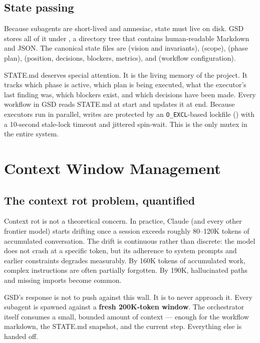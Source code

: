 \documentclass[11pt,letterpaper,openany]{book}
\begin{document}
\section{State passing}

Because subagents are short-lived and amnesiac, state must live on disk. GSD stores all of it under , a directory tree that contains human-readable Markdown and JSON. The canonical state files are  (vision and invariants),  (scope),  (phase plan),  (position, decisions, blockers, metrics), and  (workflow configuration).

STATE.md deserves special attention. It is the living memory of the project. It tracks which phase is active, which plan is being executed, what the executor's last finding was, which blockers exist, and which decisions have been made. Every workflow in GSD reads STATE.md at start and updates it at end. Because executors run in parallel, writes are protected by an \texttt{O\_EXCL}-based lockfile () with a 10-second stale-lock timeout and jittered spin-wait. This is the only mutex in the entire system.

\chapter{Context Window Management}

\section{The context rot problem, quantified}

Context rot is not a theoretical concern. In practice, Claude (and every other frontier model) starts drifting once a session exceeds roughly 80--120K tokens of accumulated conversation. The drift is continuous rather than discrete: the model does not crash at a specific token, but its adherence to system prompts and earlier constraints degrades measurably. By 160K tokens of accumulated work, complex instructions are often partially forgotten. By 190K, hallucinated paths and missing imports become common.

GSD's response is not to push against this wall. It is to never approach it. Every subagent is spawned against a \textbf{fresh 200K-token window}. The orchestrator itself consumes a small, bounded amount of context — enough for the workflow markdown, the STATE.md snapshot, and the current step. Everything else is handed off.
\end{document}
